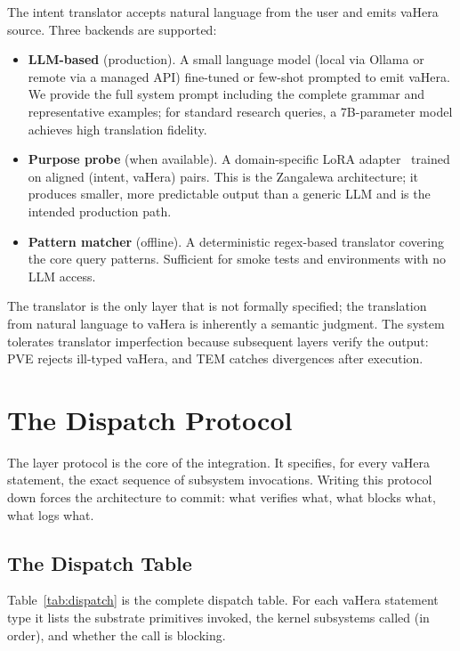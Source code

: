 \documentclass[11pt,twocolumn,a4paper]{article}
\begin{document}
The intent translator accepts natural language from the user and emits vaHera source. Three backends are supported:

\begin{itemize}[leftmargin=*]
\item \textbf{LLM-based} (production). A small language model (local via Ollama or remote via a managed API) fine-tuned or few-shot prompted to emit vaHera. We provide the full system prompt including the complete grammar and representative examples; for standard research queries, a 7B-parameter model achieves high translation fidelity.
\item \textbf{Purpose probe} (when available). A domain-specific LoRA adapter~\cite{hu2021lora} trained on aligned (intent, vaHera) pairs. This is the Zangalewa architecture; it produces smaller, more predictable output than a generic LLM and is the intended production path.
\item \textbf{Pattern matcher} (offline). A deterministic regex-based translator covering the core query patterns. Sufficient for smoke tests and environments with no LLM access.
\end{itemize}

The translator is the only layer that is not formally specified; the translation from natural language to vaHera is inherently a semantic judgment. The system tolerates translator imperfection because subsequent layers verify the output: PVE rejects ill-typed vaHera, and TEM catches divergences after execution.


\section{The Dispatch Protocol}
\label{sec:dispatch}

The layer protocol is the core of the integration. It specifies, for every vaHera statement, the exact sequence of subsystem invocations. Writing this protocol down forces the architecture to commit: what verifies what, what blocks what, what logs what.

\subsection{The Dispatch Table}

Table~\ref{tab:dispatch} is the complete dispatch table. For each vaHera statement type it lists the substrate primitives invoked, the kernel subsystems called (in order), and whether the call is blocking.
\end{document}
